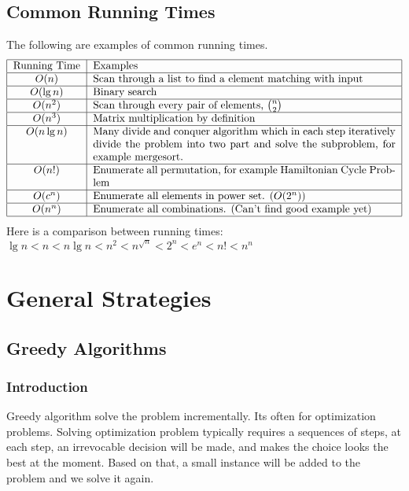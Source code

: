 		\section{Common Running Times}
			The following are examples of common running times.
			\begin{align*}
				\centering
				\begin{tabular}{|c|p{10cm}|}
					\hline
					Running Time & Examples\\
					\hline
					$O(n)$ & Scan through a list to find a element matching with input\\
					\hline
					$O(\lg n)$ & Binary search\\
					\hline
					$O(n^2)$ & Scan through every pair of elements, $\binom{n}{2}$\\
					\hline
					$O(n^3)$ & Matrix multiplication by definition\\
					\hline
					$O(n\lg n)$ & Many divide and conquer algorithm which in each step iteratively divide the problem into two part and solve the subproblem, for example mergesort.\\
					\hline
					$O(n!)$ & Enumerate all permutation, for example Hamiltonian Cycle Problem\\
					\hline
					$O(c^n)$ & Enumerate all elements in power set. ($O(2^n)$)\\
					\hline
					$O(n^n)$ & Enumerate all combinations. (Can't find good example yet)\\
					\hline
				\end{tabular}
			\end{align*}
			Here is a comparison between running times: $\lg n < n < n\lg n < n^2 < n^{\sqrt{n}} < 2^n < e^n < n! < n^n$

	\chapter{General Strategies}
		\section{Greedy Algorithms}
			\subsection{Introduction}
				Greedy algorithm solve the problem incrementally. Its often for optimization problems. Solving optimization problem typically requires a sequences of steps, at each step, an irrevocable decision will be made, and makes the choice looks the best at the moment. Based on that, a small instance will be added to the problem and we solve it again.

